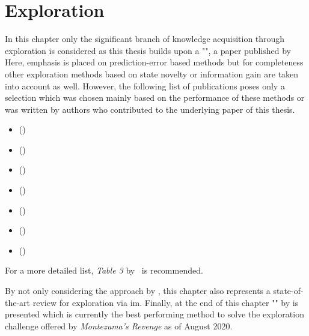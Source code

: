 \documentclass[draft,final]{vutinfth} %
\begin{document}
    \chapter{Exploration}\label{sec:state_of_the_art}
    In this chapter only the significant branch of knowledge acquisition through exploration is considered as this thesis builds upon a "", a paper published by \citeauthor{burda_large-scale_2018-1}
    Here, emphasis is placed on prediction-error based methods but for completeness other exploration methods based on state novelty or information gain are taken into account as well.
    However, the following list of publications poses only a selection which was chosen mainly based on the performance of these methods or was written by authors who contributed to the underlying paper of this thesis.

    \begin{itemize}
        \item {} (\citeauthor{stadie_incentivizing_2015})
        \item {} (\citeauthor{pathak_curiosity-driven_2017-1})
        \item {} (\citeauthor{kim_emi_2019})
        \item {} (\citeauthor{bellemare_unifying_2016})
        \item {} (\citeauthor{burda_exploration_2018})
        \item {} (\citeauthor{kim_emi_2019})
        \item {} (\citeauthor{pathak_self-supervised_2019})
    \end{itemize}

    For a more detailed list, \textit{Table 3} by~\citeauthor{aubret_survey_2019} is recommended.

    By not only considering the approach by \citeauthor{burda_large-scale_2018-1}, this chapter also represents a state-of-the-art review for exploration via \gls{im}.
    Finally, at the end of this chapter "" by \citeauthor{ecoffet_go-explore_2019} is presented which is currently the best performing method to solve the exploration challenge offered by \textit{Montezuma's Revenge} as of August 2020.
\end{document}
